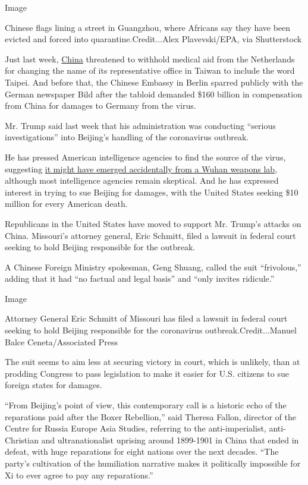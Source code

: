 Image

Chinese flags lining a street in Guangzhou, where Africans say they have
been evicted and forced into quarantine.Credit...Alex Plavevski/EPA, via
Shutterstock

Just last week,
\href{https://www.nytimes.com/2020/06/15/world/asia/beijing-coronavirus-outbreak.html}{China}
threatened to withhold medical aid from the Netherlands for changing the
name of its representative office in Taiwan to include the word Taipei.
And before that, the Chinese Embassy in Berlin sparred publicly with the
German newspaper Bild after the tabloid demanded \$160 billion in
compensation from China for damages to Germany from the virus.

Mr. Trump said last week that his administration was conducting
``serious investigations'' into Beijing's handling of the coronavirus
outbreak.

He has pressed American intelligence agencies to find the source of the
virus, suggesting
\href{https://www.nytimes.com/2020/04/30/us/politics/trump-administration-intelligence-coronavirus-china.html}{it
might have emerged accidentally from a Wuhan weapons lab}, although most
intelligence agencies remain skeptical. And he has expressed interest in
trying to sue Beijing for damages, with the United States seeking \$10
million for every American death.

Republicans in the United States have moved to support Mr. Trump's
attacks on China. Missouri's attorney general, Eric Schmitt, filed a
lawsuit in federal court seeking to hold Beijing responsible for the
outbreak.

A Chinese Foreign Ministry spokesman, Geng Shuang, called the suit
``frivolous,'' adding that it had ``no factual and legal basis'' and
``only invites ridicule.''

Image

Attorney General Eric Schmitt of Missouri has filed a lawsuit in federal
court seeking to hold Beijing responsible for the coronavirus
outbreak.Credit...Manuel Balce Ceneta/Associated Press

The suit seems to aim less at securing victory in court, which is
unlikely, than at prodding Congress to pass legislation to make it
easier for U.S. citizens to sue foreign states for damages.

``From Beijing's point of view, this contemporary call is a historic
echo of the reparations paid after the Boxer Rebellion,'' said Theresa
Fallon, director of the Centre for Russia Europe Asia Studies, referring
to the anti-imperialist, anti-Christian and ultranationalist uprising
around 1899-1901 in China that ended in defeat, with huge reparations
for eight nations over the next decades. ``The party's cultivation of
the humiliation narrative makes it politically impossible for Xi to ever
agree to pay any reparations.''

